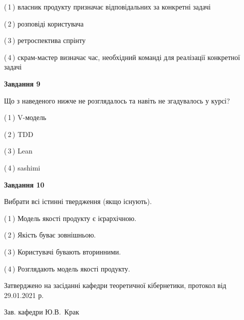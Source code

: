 \documentclass[10pt, ukrainian]{article}
\begin{document}
{\begin {large}
(\,1\,) власник продукту призначає відповідальних за конкретні задачі%



(\,2\,) розповіді користувача%



(\,3\,) ретроспектива спрінту%



(\,4\,) скрам-мастер визначає час, необхідний команді для реалізації конкретної задачі%


{\begin {center}\textbf{Завдання 9}\end {center}}\par
Що з наведеного нижче не розглядалось та навіть не згадувалось у курсі?\par
\vspace{2mm}



(\,1\,) V-модель%



(\,2\,) TDD%



(\,3\,) Lean%



(\,4\,) sashimi%


{\begin {center}\textbf{Завдання 10}\end {center}}\par
Вибрати всі істинні твердження (якщо існують).\par
\vspace{2mm}



(\,1\,) Модель якості продукту є ієрархічною.%



(\,2\,) Якість буває зовнішньою.%



(\,3\,) Користувачі бувають вторинними.%



(\,4\,) Розглядають модель якості продукту.%



\end {large}}
{\vspace{5mm}\smallskip \begin {small} Затверджено на засіданні кафедри теоретичної кібернетики, протокол  від   29.01.2021 р.\par\smallskip\smallskip
{\parbox {6.5 cm}{Зав. кафедри \dotfill Ю.В.~Крак}} \end{small}}
\newpage
\end{document}
